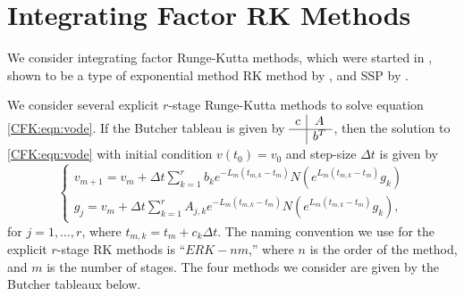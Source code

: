 \documentclass{csri19}
\begin{document}
\section{Integrating Factor RK Methods}\label{CFK:sec:ifrk}
We consider integrating factor Runge-Kutta methods, which were started in 
\cite{CFK:Lawson1969}, shown to be a type of exponential method RK method by
\cite{CFK:Minchev2006}, and SSP by \cite{CFK:Isherwood2018}.

We consider several explicit $r$-stage Runge-Kutta methods to solve equation
\ref{CFK:eqn:vode}. If the Butcher tableau is given by $\begin{array}{c|c}
c & A \\ \hline & b^T \end{array}$, then the solution to \ref{CFK:eqn:vode} with
initial condition $v(t_0) = v_0$ and step-size $\Delta t$ is given by
\[ \left\{\begin{array}{l} v_{m+1} = v_m + \Delta t\sum_{k=1}^r b_k 
                         e^{-L_m(t_{m,k}-t_m)}N(e^{L_m(t_{m,k}-t_m)}g_k) \\
          g_j = v_m + \Delta t \sum_{k=1}^r A_{j,k} e^{-L_m(t_{m,k} - t_m)} 
                      N(e^{L_m(t_{m,k}-t_m)}g_k), \end{array} \right. \]
for $j = 1,\dots,r$, where $t_{m,k} = t_m + c_k \Delta t$.
The naming convention we use for the explicit $r$-stage RK methods is ``$ERK
-nm$,'' where $n$ is the order of the method, and $m$ is the number of
stages. The four methods we consider are given by the Butcher tableaux 
below.
\end{document}

